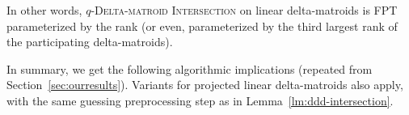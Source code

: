 In other words, \textsc{$q$-Delta-matroid Intersection} on linear
delta-matroids is FPT parameterized by the rank
(or even, parameterized by the third largest rank of the participating delta-matroids).

In summary, we get the following algorithmic implications (repeated
from Section~\ref{sec:ourresults}). Variants for projected linear
delta-matroids also apply, with the same guessing preprocessing step
as in Lemma~\ref{lm:ddd-intersection}.

